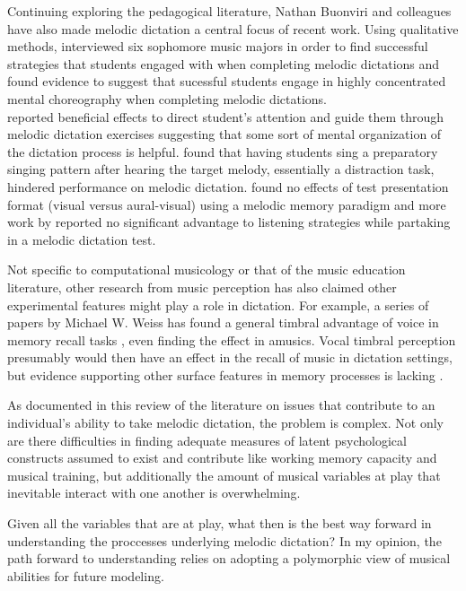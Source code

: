 \documentclass[]{book}
\begin{document}
Continuing exploring the pedagogical literature, Nathan Buonviri and colleagues have also made melodic dictation a central focus of recent work.
Using qualitative methods, \citet{buonviriEffectsMusicNotation2015} interviewed six sophomore music majors in order to find successful strategies that students engaged with when completing melodic dictations and found evidence to suggest that sucessful students engage in highly concentrated mental choreography when completing melodic dictations.\\
\citet{paneyEffectDirectingAttention2016} reported beneficial effects to direct student's attention and guide them through melodic dictation exercises suggesting that some sort of mental organization of the dictation process is helpful.
\citet{buonviriMelodicDictationInstruction2015} found that having students sing a preparatory singing pattern after hearing the target melody, essentially a distraction task, hindered performance on melodic dictation.
\citet{buonviriEffectsMusicNotation2015} found no effects of test presentation format (visual versus aural-visual) using a melodic memory paradigm and more work by \citet{buonviriEffectsTwoListening2017} reported no significant advantage to listening strategies while partaking in a melodic dictation test.

Not specific to computational musicology or that of the music education literature, other research from music perception has also claimed other experimental features might play a role in dictation.
For example, a series of papers by Michael W. Weiss has found a general timbral advantage of voice in memory recall tasks \citep{weissRapidCommunicationPianists2015, weissAbilityProcessMusical2019}, even finding the effect in amusics.
Vocal timbral perception presumably would then have an effect in the recall of music in dictation settings, but evidence supporting other surface features in memory processes is lacking \citep{schellenbergMemorySurfaceFeatures2014}.

As documented in this review of the literature on issues that contribute to an individual's ability to take melodic dictation, the problem is complex.
Not only are there difficulties in finding adequate measures of latent psychological constructs assumed to exist and contribute like working memory capacity and musical training, but additionally the amount of musical variables at play that inevitable interact with one another is overwhelming.

Given all the variables that are at play, what then is the best way forward in understanding the proccesses underlying melodic dictation?
In my opinion, the path forward to understanding relies on adopting a polymorphic view of musical abilities for future modeling.
\end{document}
